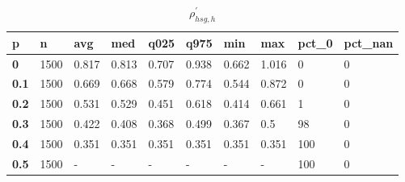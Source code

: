 \begin{table}[h]
 \centering 
\footnotesize
\caption{$\rho_{hsg,h}^\prime $}
\label{tab:alphahsgh}
\begin{tabular}[h]{|l|l|l|l|l|l|l|l|l|l|
    } \hline
\textbf{ p} & \textbf{ n} & \textbf{ avg} & \textbf{ med} & \textbf{ q025} & \textbf{ q975} & \textbf{ min} & \textbf{ max} & \textbf{ pct\_0} & \textbf{ pct\_nan}
    \\ \hline
  \textbf{  0} & 1500 & 0.817 & 0.813 & 0.707 & 0.938 & 0.662 & 1.016 &   0 & 0
    \\ \hline
  \textbf{0.1} & 1500 & 0.669 & 0.668 & 0.579 & 0.774 & 0.544 & 0.872 &   0 & 0
    \\ \hline
  \textbf{0.2} & 1500 & 0.531 & 0.529 & 0.451 & 0.618 & 0.414 & 0.661 &   1 & 0
    \\ \hline
  \textbf{0.3} & 1500 & 0.422 & 0.408 & 0.368 & 0.499 & 0.367 &   0.5 &  98 & 0
    \\ \hline
  \textbf{0.4} & 1500 & 0.351 & 0.351 & 0.351 & 0.351 & 0.351 & 0.351 & 100 & 0
    \\ \hline
  \textbf{0.5} & 1500 & - & - & - & - & - & - & 100 & 0
    \\ \hline
 \end{tabular}
 \end{table}
